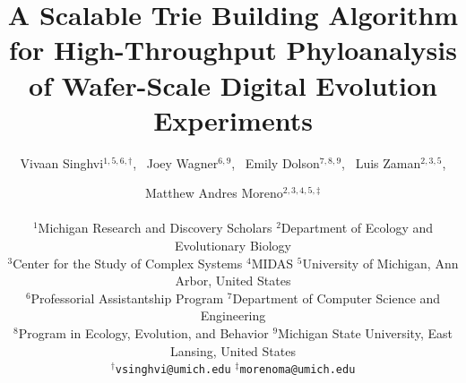 \title{A Scalable Trie Building Algorithm for High-Throughput Phyloanalysis of Wafer-Scale Digital Evolution Experiments}

\author{
    Vivaan Singhvi$^{1,5,6,\dagger}$,\ %
    Joey Wagner$^{6,9}$,\ %
    Emily Dolson$^{7,8,9}$,\ %
    Luis Zaman$^{2,3,5}$, \and
    Matthew Andres Moreno$^{2,3,4,5,\ddagger}$ \\
    \mbox{}\\
    $^1$Michigan Research and Discovery Scholars
    $^2$Department of Ecology and Evolutionary Biology \\
    $^3$Center for the Study of Complex Systems
    $^4$MIDAS
    $^5$University of Michigan, Ann Arbor, United States \\
    $^6$Professorial Assistantship Program
    $^7$Department of Computer Science and Engineering \\
    $^8$Program in Ecology, Evolution, and Behavior
    $^9$Michigan State University, East Lansing, United States \\
    $^\dagger$\texttt{vsinghvi@umich.edu} $^\ddagger$\texttt{morenoma@umich.edu}
}

\maketitle
